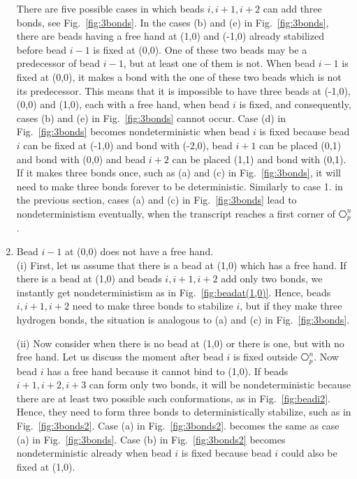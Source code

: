 \begin{enumerate}
There are five possible cases in which beads $i, i+1, i+2$ can add three bonds, see Fig.~\ref{fig:3bonds}. In the cases (b) and (e) in Fig.~\ref{fig:3bonds}, there are beads having a free hand at (1,0) and (-1,0) already stabilized before bead $i-1$ is fixed at (0,0). One of these two beads may be a predecessor of bead $i-1$, but at least one of them is not. When bead $i-1$ is fixed at (0,0), it makes a bond with the one of these two beads which is not its predecessor. This means that it is impossible to have three beads at (-1,0), (0,0) and (1,0), each with a free hand, when bead $i$ is fixed, and consequently, cases (b) and (e) in Fig.~\ref{fig:3bonds} cannot occur. Case (d) in Fig.~\ref{fig:3bonds} becomes nondeterministic when bead $i$ is fixed because bead $i$ can be fixed at (-1,0) and bond with (-2,0), bead $i+1$ can be placed (0,1) and bond with (0,0) and bead $i+2$ can be placed (1,1) and bond with (0,1). If it makes three bonds once, such as (a) and (c) in Fig.~\ref{fig:3bonds}, it will need to make three bonds forever to be deterministic. Similarly to case 1. in the previous section, cases (a) and (c) in Fig.~\ref{fig:3bonds} lead to nondeterministism eventually, when the transcript reaches a first corner of $\hexagon_p^n$.



\item Bead $i-1$ at (0,0) does not have a free hand.\\
(i) First, let us assume that there is a bead at (1,0) which has a free hand. If there is a bead at (1,0) and beads $i, i+1, i+2$ add only two bonds, we instantly get nondeterministism as in Fig.~\ref{fig:beadat(1,0)}. Hence, beads $i, i+1, i+2$ need to make three bonds to stabilize $i$, but if they make three hydrogen bonds, the situation is analogous to (a) and (c) in Fig.~\ref{fig:3bonds}. 

(ii) Now consider when there is no bead at (1,0) or there is one, but with no free hand. Let us discuss the moment after bead $i$ is fixed outside $\hexagon_p^n$. Now bead $i$ has a free hand because it cannot bind to (1,0). If beads $i+1, i+2, i+3$ can form only two bonds, it will be nondeterministic because there are at least two possible such conformations, as in Fig.~\ref{fig:beadi2}. Hence, they need to form three bonds to deterministically stabilize, such as in Fig.~\ref{fig:3bonds2}. Case (a) in Fig.~\ref{fig:3bonds2}. becomes the same as case (a) in Fig.~\ref{fig:3bonds}. Case (b) in Fig.~\ref{fig:3bonds2} becomes nondeterministic already when bead $i$ is fixed because bead $i$ could also be fixed at (1,0).\\


\end{enumerate}
